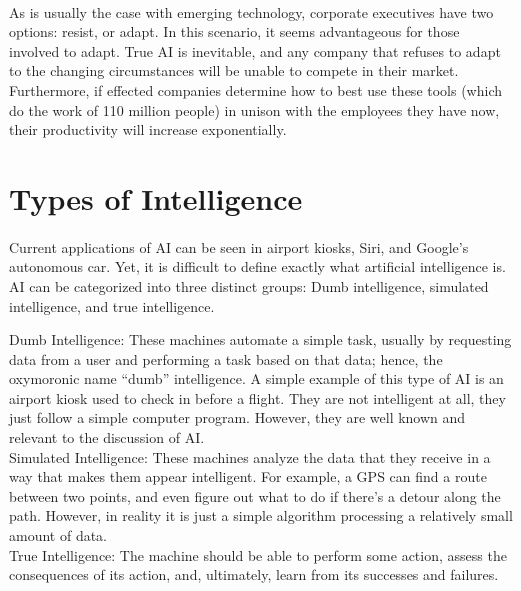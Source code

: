 \documentclass{article}
\newenvironment{myindentpar}[1]
 {\begin{list}{}
         {\setlength{\leftmargin}{#1}}
         \item[]
 }
 {\end{list}}
\begin{document}
    \paragraph{}
      As is usually the case with emerging technology, corporate executives have
      two options: resist, or adapt. In this scenario, it seems advantageous for
      those involved to adapt. True AI is inevitable, and any company that
      refuses to adapt to the changing circumstances will be unable to compete
      in their market. Furthermore, if effected companies determine how to best
      use these tools (which do the work of 110 million people) in unison
      with the employees they have now, their productivity will increase exponentially.

  \section{Types of Intelligence}

    \paragraph{}
      Current applications of AI can be seen in airport kiosks, Siri, and Google's
      autonomous car. Yet, it is difficult to define exactly what artificial
      intelligence is. AI can be categorized into three distinct groups: Dumb
      intelligence, simulated intelligence, and true intelligence.\\

    \begin{myindentpar}{1cm}
      Dumb Intelligence: These machines automate a simple task, usually by requesting
      data from a user and performing a task based on that data; hence, the
      oxymoronic name ``dumb'' intelligence. A simple example of this type of AI
      is an airport kiosk used to check in before a flight. They are not intelligent at all,
      they just follow a simple computer program. However, they are well known
      and relevant to the discussion of AI.\\

      Simulated Intelligence: These machines analyze the data that they
      receive in a way that makes them appear intelligent.
      For example, a GPS can find a route between two points, and even figure out what
      to do if there's a detour along the path. However, in reality it is just a
      simple algorithm processing a relatively small amount of data.\\

      True Intelligence: The machine should be able to perform some action,
      assess the consequences of its action, and, ultimately, learn from its
      successes and failures.
    \end{myindentpar}
\end{document}
